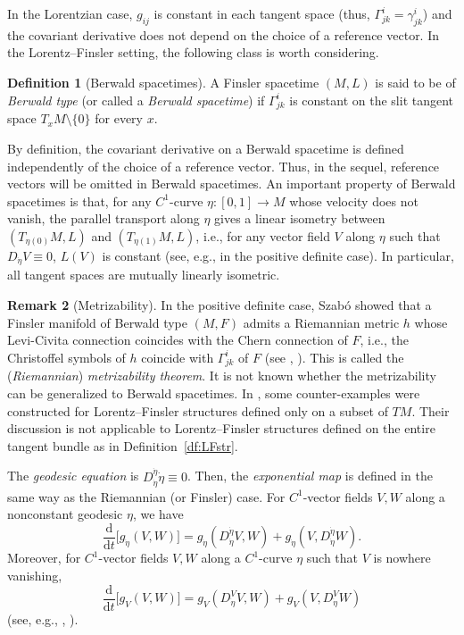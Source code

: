 \documentclass[a4paper,11pt]{article}
\numberwithin{equation}{section}
\theoremstyle{definition}
\newtheorem{definition}{Definition}[section]
\newtheorem{remark}[definition]{Remark}
\theoremstyle{plain}
\newcommand{\lra}{\longrightarrow}
\newcommand{\dd}{\mathrm{d}}
\begin{document}
In the Lorentzian case, $g_{ij}$ is constant in each tangent space (thus, $\Gamma^i_{jk}=\gamma^i_{jk}$)
and the covariant derivative does not depend on the choice of a reference vector.
In the Lorentz--Finsler setting, the following class is worth considering.

\begin{definition}[Berwald spacetimes]\label{df:Ber}
A Finsler spacetime $(M,L)$ is said to be of \emph{Berwald type} (or called a \emph{Berwald spacetime})
if $\Gamma^i_{jk}$ is constant on the slit tangent space $T_xM \setminus \{0\}$ for every $x$.
\end{definition}

By definition, the covariant derivative on a Berwald spacetime is defined independently of the choice of a reference vector.
Thus, in the sequel, reference vectors will be omitted in Berwald spacetimes.
An important property of Berwald spacetimes is that,
for any $C^1$-curve $\eta\colon [0,1] \lra M$ whose velocity does not vanish,
the parallel transport along $\eta$ gives a linear isometry between $(T_{\eta(0)}M,L)$ and $(T_{\eta(1)}M,L)$, i.e., for any vector field $V$ along $\eta$ such that $D_{\dot{\eta}}V \equiv 0$, $L(V)$ is constant (see, e.g., \cite[Proposition~6.5]{Obook} in the positive definite case).
In particular, all tangent spaces are mutually linearly isometric.

\begin{remark}[Metrizability]\label{rm:met}
In the positive definite case,
Szab\'o showed that a Finsler manifold of Berwald type $(M,F)$ admits a Riemannian metric $h$
whose Levi-Civita connection coincides with the Chern connection of $F$,
i.e., the Christoffel symbols of $h$ coincide with $\Gamma^i_{jk}$ of $F$
(see \cite{Sz}, \cite[Exercise~10.1.4]{BCS}).
This is called the (\emph{Riemannian}) \emph{metrizability theorem}.
It is not known whether the metrizability can be generalized to Berwald spacetimes.
In \cite{FHPV}, some counter-examples were constructed for Lorentz--Finsler structures
defined only on a subset of $TM$.
Their discussion is not applicable to Lorentz--Finsler structures defined on the entire tangent bundle as in Definition~\ref{df:LFstr}.
\end{remark}

The \emph{geodesic equation} is $D^{\dot{\eta}}_{\dot{\eta}}\dot{\eta} \equiv 0$.
Then, the \emph{exponential map} is defined in the same way as the Riemannian (or Finsler) case.
For $C^1$-vector fields $V,W$ along a nonconstant geodesic $\eta$, we have
\begin{equation}\label{eq:g_eta}
\frac{\dd}{\dd t}\bigl[ g_{\dot{\eta}}(V,W) \bigr]
 =g_{\dot{\eta}}(D^{\dot{\eta}}_{\dot{\eta}}V,W) +g_{\dot{\eta}}(V,D^{\dot{\eta}}_{\dot{\eta}}W).
\end{equation}
Moreover, for $C^1$-vector fields $V,W$ along a $C^1$-curve $\eta$ such that $V$ is nowhere vanishing,
\begin{equation}\label{eq:g_V}
\frac{\dd}{\dd t}\bigl[ g_V(V,W) \bigr] =g_V(D^V_{\dot{\eta}}V,W) +g_V(V,D^V_{\dot{\eta}}W)
\end{equation}
(see, e.g.,  \cite[(3.1), (3.2)]{LMO1}, \cite[Lemmas~4.8, 4.9]{Obook}).
\end{document}
